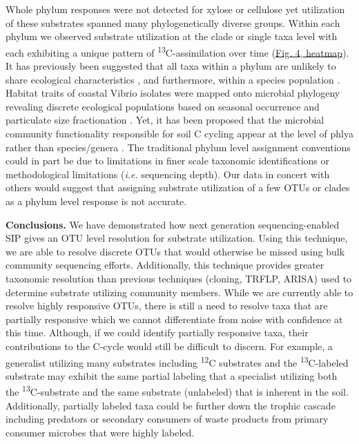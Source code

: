 Whole phylum responses were not detected for xylose or cellulose yet
utilization of these substrates spanned many phylogenetically diverse groups.
Within each phylum we observed substrate utilization at the clade or single
taxa level with each exhibiting a unique pattern of
\textsuperscript{13}C-assimilation over time
(\href{https://authorea.com/users/3537/articles/3612/master/file/figures/bacteria_tree/bacteria_tree.png}{Fig.
4, heatmap}). It has previously been suggested that all taxa within a phylum
are unlikely to share ecological characteristics \cite{Fierer_2007}, and
furthermore, within a species population
\cite{Choudoir_2012,Preheim_2011,Hunt_2008}. Habitat traits of coastal Vibrio
isolates were mapped onto microbial phylogeny revealing discrete ecological
populations based on seasonal occurrence and particulate size fractionation
\cite{Preheim_2011,Hunt_2008}. Yet, it has been proposed that the microbial
community functionality responsible for soil C cycling appear at the level of
phlya rather than species/genera \cite{Schimel_2012}. The traditional phylum
level assignment conventions could in part be due to limitations in finer scale
taxonomic identifications or methodological limitations (\textit{i.e.}
sequencing depth). Our data in concert with others
\cite{Goldfarb_2011,Fierer_2007,Choudoir_2012,Preheim_2011,Hunt_2008} would
suggest that assigning substrate utilization of a few OTUs or clades as a
phylum level response is not accurate.

\textbf{Conclusions.} We have demonstrated how next generation
sequencing-enabled SIP gives an OTU level resolution for substrate utilization.
Using this technique, we are able to resolve discrete OTUs that would otherwise
be missed using bulk community sequencing efforts. Additionally, this technique
provides greater taxonomic resolution than previous techniques (cloning, TRFLP,
ARISA) used to determine substrate utilizing community members. While we are
currently able to resolve highly responsive OTUs, there is still a need to
resolve taxa that are partially responsive which we cannot differentiate from
noise with confidence at this time. Although, if we could identify partially
responsive taxa, their contributions to the C-cycle would still be difficult to
discern. For example, a generalist utilizing many substrates including
\textsuperscript{12}C substrates and the \textsuperscript{13}C-labeled
substrate may exhibit the same partial labeling that a specialist utilizing
both the \textsuperscript{13}C-substrate and the same substrate (unlabeled)
that is inherent in the soil. Additionally, partially labeled taxa could be
further down the trophic cascade including predators or secondary consumers of
waste products from primary consumer microbes that were highly labeled.   

